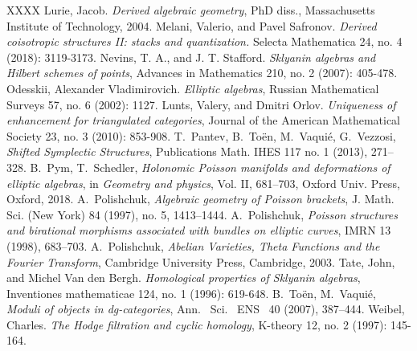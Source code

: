 \documentclass[reqno]{amsart}
\theoremstyle{definition}
\theoremstyle{remark}
\numberwithin{equation}{section}
\begin{document}
\begin{thebibliography}{XXXX}
Lurie, Jacob. \emph{Derived algebraic geometry}, PhD diss., Massachusetts Institute of Technology, 2004.
 Melani, Valerio, and Pavel Safronov. \emph{Derived coisotropic structures II: stacks and quantization.} Selecta Mathematica 24, no. 4 (2018): 3119-3173.
 Nevins, T. A., and J. T. Stafford. \emph{Sklyanin algebras and Hilbert schemes of points}, Advances in Mathematics 210, no. 2 (2007): 405-478.
 Odesskii, Alexander Vladimirovich. \emph{Elliptic algebras}, Russian Mathematical Surveys 57, no. 6 (2002): 1127.
 Lunts, Valery, and Dmitri Orlov. {\it Uniqueness of enhancement for triangulated categories}, Journal of the American Mathematical Society 23, no. 3 (2010): 853-908.
 T.~Pantev, B.~To\"en, M.~Vaqui\'e, G.~Vezzosi, \emph{Shifted Symplectic Structures}, Publications Math. IHES 117 no. 1 (2013), 271--328.
 B.~Pym, T.~Schedler, {\it Holonomic Poisson manifolds and deformations of elliptic algebras}, in {\it Geometry and physics}, Vol. II, 681--703, Oxford Univ. Press, 
Oxford, 2018.
 A.~Polishchuk, {\it Algebraic geometry of Poisson brackets},
J. Math. Sci. (New York) 84 (1997), no. 5, 1413--1444.
 A.~Polishchuk, {\it Poisson structures and birational morphisms associated with bundles on elliptic curves}, IMRN 13 (1998), 683--703.
 A.~Polishchuk, {\it Abelian Varieties, Theta Functions and the Fourier Transform}, Cambridge University Press, Cambridge, 2003.
 Tate, John, and Michel Van den Bergh. \emph{Homological properties of Sklyanin algebras}, Inventiones mathematicae 124, no. 1 (1996): 619-648.
 B.~To\"en, M.~Vaqui\'e, \emph{Moduli of objects in dg-categories}, Ann. ~Sci.~ ENS~ 40 (2007), 387--444.
 Weibel, Charles. {\it The Hodge filtration and cyclic homology}, K-theory 12, no. 2 (1997): 145-164.
\end{thebibliography}
\end{document}
